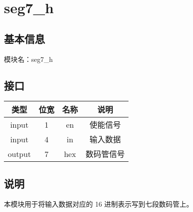 \section{seg7\_h}
\subsection{基本信息}
模块名：seg7\_h
\subsection{接口}
\begin{tabular}{|c|c|c|c|}
    \hline
    类型    &   位宽    &   名称    &   说明\\\hline
    input   &   1   &   en &   使能信号\\\hline
    input   &   4   &   in  &   输入数据\\\hline
    output   &   7   &   hex  &   数码管信号\\\hline
\end{tabular}
\subsection{说明}
本模块用于将输入数据对应的 16 进制表示写到七段数码管上。\\